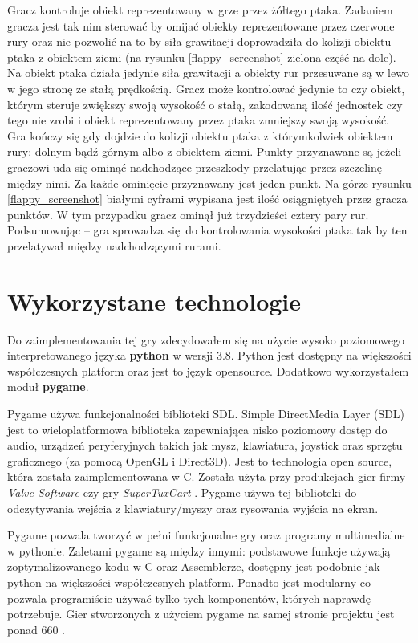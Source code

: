 \documentclass[a4paper, 12pt,oneside]{book}
\begin{document}
Gracz kontroluje obiekt reprezentowany w grze przez żółtego ptaka.
Zadaniem gracza jest tak nim sterować by omijać obiekty reprezentowane przez 
czerwone rury oraz nie pozwolić na to by siła grawitacji doprowadziła do
kolizji obiektu ptaka z obiektem ziemi (na rysunku \ref{flappy_screenshot}
zielona część na dole). Na obiekt ptaka działa jedynie siła grawitacji a
obiekty rur przesuwane są w lewo w jego stronę ze stałą prędkością. Gracz
może kontrolować jedynie to czy obiekt, którym steruje zwiększy swoją
wysokość o stałą, zakodowaną ilość jednostek czy tego nie zrobi i obiekt
reprezentowany przez ptaka zmniejszy swoją wysokość. Gra kończy się gdy
dojdzie do kolizji obiektu ptaka z którymkolwiek obiektem rury: dolnym
bądź górnym albo z obiektem ziemi. Punkty przyznawane są jeżeli graczowi uda
się ominąć nadchodzące przeszkody przelatując przez szczelinę między nimi.
Za każde ominięcie przyznawany jest jeden punkt. Na górze rysunku
\ref{flappy_screenshot} białymi cyframi wypisana jest ilość osiągniętych przez
gracza punktów. W tym przypadku gracz ominął już trzydzieści cztery pary rur.
Podsumowując -- gra sprowadza się do kontrolowania wysokości ptaka tak by ten
przelatywał między nadchodzącymi rurami.

\section{Wykorzystane technologie}
Do zaimplementowania tej gry zdecydowałem się na użycie wysoko poziomowego
interpretowanego języka \textbf{python} w wersji 3.8. Python jest dostępny na
większości współczesnych platform oraz jest to język  open\dywiz source.
Dodatkowo wykorzystałem moduł \textbf{pygame}.

Pygame używa funkcjonalności biblioteki SDL. Simple DirectMedia Layer (SDL)
jest to wieloplatformowa biblioteka zapewniająca nisko poziomowy dostęp do
audio, urządzeń peryferyjnych takich jak mysz, klawiatura, joystick oraz
sprzętu graficznego (za pomocą OpenGL i Direct3D). Jest to technologia open
source, która została zaimplementowana w C. Została użyta przy produkcjach gier
firmy \textit{Valve Software} czy gry \textit{SuperTuxCart} \cite{sdl_ref}.
Pygame używa tej biblioteki do odczytywania wejścia z klawiatury/myszy oraz
rysowania wyjścia na ekran.

Pygame pozwala tworzyć w pełni funkcjonalne gry oraz programy multimedialne
w pythonie. Zaletami pygame są między innymi: podstawowe funkcje używają
zoptymalizowanego kodu w C oraz Assemblerze, dostępny jest podobnie jak python
na większości współczesnych platform. Ponadto jest modularny co pozwala
programiście używać tylko tych komponentów, których naprawdę potrzebuje.
Gier stworzonych z użyciem pygame na samej stronie projektu jest ponad
660 \cite{pygame_about_ref}.
\end{document}
